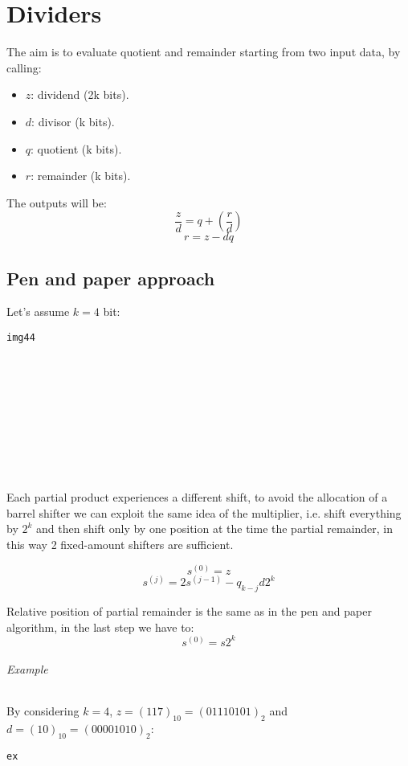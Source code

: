 \chapter{Dividers}
The aim is to evaluate quotient and remainder starting from two input data, by calling:
\begin{itemize}
  \item $z$: dividend (2k bits).
  \item $d$: divisor  (k bits).
  \item $q$: quotient (k bits).
  \item $r$: remainder  (k bits). %
\end{itemize}

The outputs will be:
$$\frac{z}{d}=q+(\frac{r}{d})$$
$$r=z-dq$$

\section{Pen and paper approach}

Let's assume $k=4$ bit:

\begin{verbatim}
img44











\end{verbatim}

Each partial product experiences a different shift, to avoid the allocation of a barrel shifter we can exploit the same idea of the multiplier, i.e. shift everything by $2^k$ and then shift only by one position at the time the partial remainder, in this way 2 fixed-amount shifters are sufficient.

$$s^{(0)}=z $$ 
$$ s^{(j)}=2s^{(j-1)}-q_{k-j}d2^k$$

Relative position of partial remainder is the same as in the pen and paper algorithm, in the last step we have to:
$$s^{(0)}=s2^k$$

\subparagraph{Example}
By considering $k=4$, $z=(117)_{10}=(01110101)_2$ and $d=(10)_{10}=(00001010)_2$:

\begin{verbatim}
ex























\end{verbatim}

